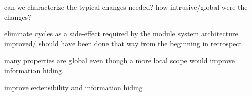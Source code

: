 can we characterize the typical changes needed?
how intrusive/global were the changes?

eliminate cycles as a side-effect
  required by the module system
  architecture improved/ should have been done that way from the beginning
  in retrospect



many properties
are global even though a more local scope would improve information hiding.

improve extensibility and information hiding



 
 
